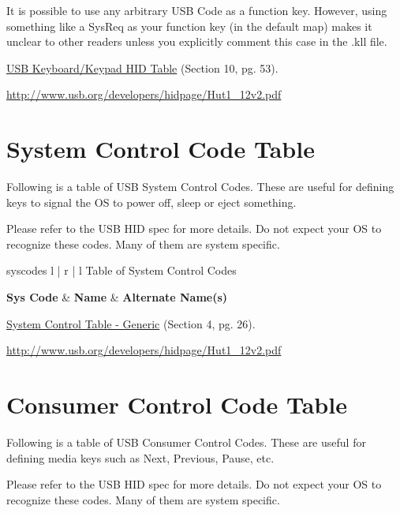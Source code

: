 \documentclass{kiibohd-template}
\begin{document}
It is possible to use any arbitrary USB Code as a function key.
However, using something like a SysReq as your function key (in the default map) makes it unclear to other readers unless you explicitly comment this case in the .kll file.

\href{http://www.usb.org/developers/hidpage/Hut1_12v2.pdf}{USB Keyboard/Keypad HID Table} (Section 10, pg. 53).

\href{http://www.usb.org/developers/hidpage/Hut1_12v2.pdf}{http://www.usb.org/developers/hidpage/Hut1\_12v2.pdf}


\newpage
\chapter{System Control Code Table}
\label{chpt:SysCodeTable}

Following is a table of USB System Control Codes.
These are useful for defining keys to signal the OS to power off, sleep or eject something.

Please refer to the USB HID spec for more details.
Do not expect your OS to recognize these codes.
Many of them are system specific.

\begin{ltable}{syscodes}{ l | r | l }{Table of System Control Codes}

\textbf{Sys Code} & \textbf{Name} & \textbf{Alternate Name(s)} \\
\hline
\hline


\end{ltable}

\href{http://www.usb.org/developers/hidpage/Hut1_12v2.pdf}{System Control Table - Generic} (Section 4, pg. 26).

\href{http://www.usb.org/developers/hidpage/Hut1_12v2.pdf}{http://www.usb.org/developers/hidpage/Hut1\_12v2.pdf}


\newpage
\chapter{Consumer Control Code Table}
\label{chpt:ConsCodeTable}

Following is a table of USB Consumer Control Codes.
These are useful for defining media keys such as Next, Previous, Pause, etc.

Please refer to the USB HID spec for more details.
Do not expect your OS to recognize these codes.
Many of them are system specific.
\end{document}
